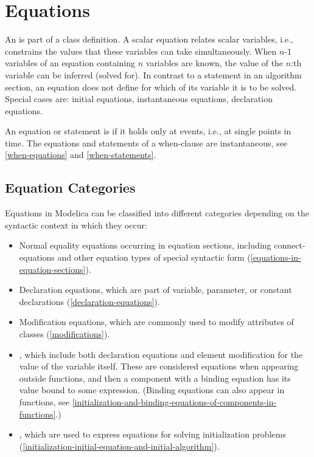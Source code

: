 \chapter{Equations}\label{equations}

An  is part of a class definition.
A scalar equation relates scalar variables, i.e., constrains the values that these variables can take simultaneously.
When $n$-1 variables of an equation containing $n$ variables are known, the value of the $n$:th variable can be inferred (solved for).
In contrast to a statement in an algorithm section, an equation does not define for which of its variable it is to be solved.
Special cases are: initial equations, instantaneous equations, declaration equations.

An equation or statement is  if it holds only at events, i.e., at single points in time.
The equations and statements of a when-clause are instantaneous, see \cref{when-equations} and \cref{when-statements}.

\section{Equation Categories}\label{equation-categories}

Equations in Modelica can be classified into different categories depending on the syntactic context in which they occur:
\begin{itemize}
\item
  Normal equality equations occurring in equation sections, including connect-equations and other equation types of special syntactic form (\cref{equations-in-equation-sections}).
\item
  Declaration equations, which are part of variable, parameter, or constant declarations (\cref{declaration-equations}).
\item
  Modification equations, which are commonly used to modify attributes of classes (\cref{modifications}).
\item
  , which include both declaration equations and element modification for the value of the variable itself.
  These are considered equations when appearing outside functions, and then a component with a binding equation has its value bound to some expression.
  (Binding equations can also appear in functions, see \cref{initialization-and-binding-equations-of-components-in-functions}.)
\item
  , which are used to express equations for solving initialization problems (\cref{initialization-initial-equation-and-initial-algorithm}).
\end{itemize}


